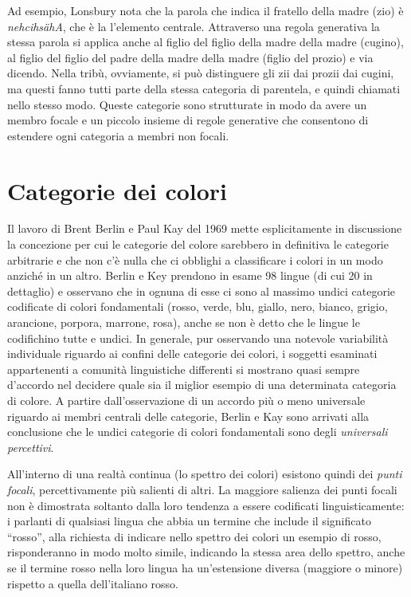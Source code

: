 Ad esempio, Lonsbury nota che la parola che indica il fratello della madre (zio) è \emph{nehcihsähA}, che è la l'elemento centrale. Attraverso una regola generativa la stessa parola si applica anche al figlio del figlio della madre della madre (cugino), al figlio del figlio del padre della madre della madre (figlio del prozio) e via dicendo. Nella tribù, ovviamente, si può distinguere gli zii dai prozii dai cugini, ma questi fanno tutti parte della stessa categoria di parentela, e quindi chiamati nello stesso modo. Queste categorie sono strutturate in modo da avere un membro focale e un piccolo insieme di regole generative che consentono di estendere ogni categoria a membri non focali.

\section{Categorie dei colori}
Il lavoro di Brent Berlin e Paul Kay del 1969 mette esplicitamente in discussione la concezione per cui le categorie del colore sarebbero in definitiva le categorie arbitrarie e che non c’è nulla che ci obblighi a classificare i colori in un modo anziché in un altro. Berlin e Key prendono in esame 98 lingue (di cui 20 in dettaglio) e osservano che in ognuna di esse ci sono al massimo undici categorie codificate di colori fondamentali (rosso, verde, blu, giallo, nero, bianco, grigio, arancione, porpora, marrone, rosa), anche se non è detto che le lingue le codifichino tutte e undici. In generale, pur osservando una notevole variabilità individuale riguardo ai confini delle categorie dei colori, i soggetti esaminati appartenenti a comunità linguistiche differenti si mostrano quasi sempre d’accordo nel decidere quale sia il miglior esempio di una determinata categoria di colore. A partire dall’osservazione di un accordo più o meno universale riguardo ai membri centrali delle categorie, Berlin e Kay sono arrivati alla conclusione che le undici categorie di colori fondamentali sono degli \emph{universali percettivi}.

All'interno di una realtà continua (lo spettro dei colori) esistono quindi dei \emph{punti focali}, percettivamente più salienti di altri. La maggiore salienza dei punti focali non è dimostrata soltanto dalla loro tendenza a essere codificati linguisticamente: i parlanti di qualsiasi lingua che abbia un termine che include il significato ``rosso'', alla richiesta di indicare nello spettro dei colori un esempio di rosso, risponderanno in modo molto simile, indicando la stessa area dello spettro, anche se il termine rosso nella loro lingua ha un'estensione diversa (maggiore o minore) rispetto a quella dell'italiano rosso.

